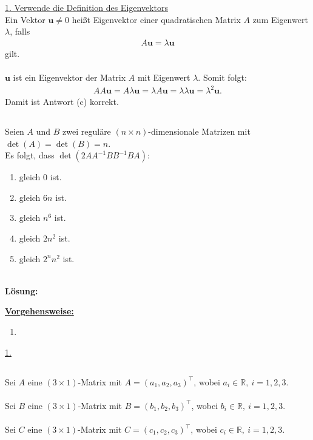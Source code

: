 \underline{1. Verwende die Definition des Eigenvektors}\\
Ein Vektor $\mathbf{u} \neq 0$ heißt Eigenvektor einer quadratischen Matrix $A$ zum Eigenwert $\lambda$, falls
\begin{align*}
	A \mathbf{u} = \lambda \mathbf{u}
\end{align*}
gilt.\\
\\
$\mathbf{u}$ ist ein Eigenvektor der Matrix $A$ mit Eigenwert $\lambda $.
Somit folgt:
\begin{align*}
	A A \mathbf{u} 
	=
	A \lambda \mathbf{u} 
	= 
	\lambda A \mathbf{u} 
	= 
	\lambda \lambda \mathbf{u}
	= 
	\lambda^2 \mathbf{u}.
\end{align*}
Damit ist Antwort (c) korrekt.



\newpage
\subsection*{}
Seien $A$ und $B$ zwei reguläre $(n \times n)$-dimensionale Matrizen mit $\det(A) = \det(B) = n$.\\
Es folgt, dass $\det(2AA^{-1} B B^{-1} B A)$:
\renewcommand{\labelenumi}{(\alph{enumi})}
\begin{enumerate}
	\item 
	gleich $0$ ist.
	\item
	gleich $6n$ ist.
	\item
	gleich $n^6$ ist.
	\item
	gleich $2 n^2$ ist.
	\item
	gleich $2^n n^2$ ist.
\end{enumerate}
\ \\
\textbf{Lösung:}
\begin{mdframed}
\underline{\textbf{Vorgehensweise:}}
\renewcommand{\labelenumi}{\theenumi.}
\begin{enumerate}
\item 
\end{enumerate}
\end{mdframed}

\underline{1. }\\

\newpage

\subsection*{}
Sei $ A $ eine $ (3 \times 1) $-Matrix mit $A = (a_1, a_2, a_3)^\top$, wobei $ a_i \in \mathbb{R}, \ i = 1,2,3$.\\
\\
Sei $ B $ eine $ (3 \times 1) $-Matrix mit $B = (b_1, b_2, b_3)^\top$, wobei $ b_i \in \mathbb{R}, \ i = 1,2,3$.\\
\\
Sei $ C $ eine $ (3 \times 1) $-Matrix mit $C = (c_1, c_2, c_3)^\top$, wobei $ c_i \in \mathbb{R}, \ i = 1,2,3$.\\

